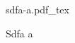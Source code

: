 \documentclass[AutoFakeBold,twoside]{article}
\newcommand{\incfig}[1]{%
    \def\svgwidth{\columnwidth}
    {#1.pdf_tex}
}
\begin{document}
\begin{figure}[ht]
    \centering
    \incfig{sdfa-a}
    \caption{Sdfa a}
    \label{fig:sdfa-a}
\end{figure}
	
\end{document}

